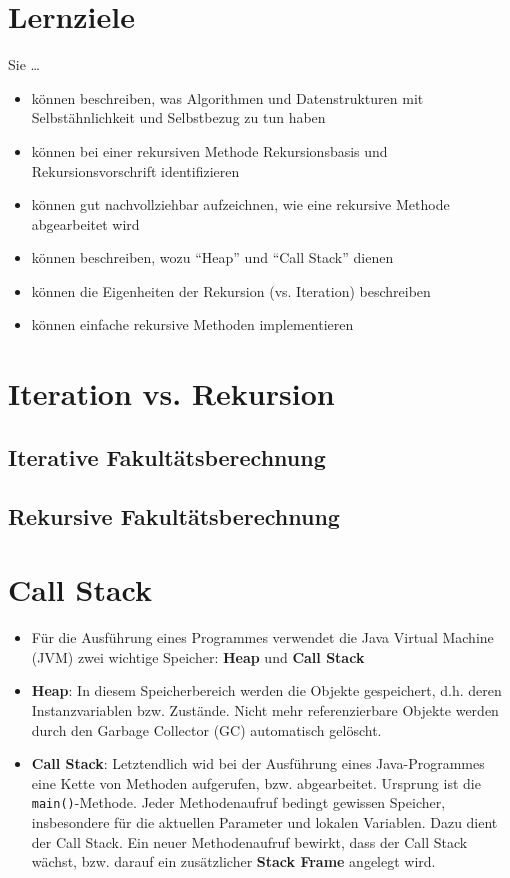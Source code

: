 \section{Lernziele}
Sie \dots
\begin{itemize}[noitemsep,topsep=0pt,leftmargin=*]
    \item können beschreiben, was Algorithmen und Datenstrukturen mit Selbstähnlichkeit und Selbstbezug zu tun haben
    \item können bei einer rekursiven Methode Rekursionsbasis und Rekursionsvorschrift identifizieren
    \item können gut nachvollziehbar aufzeichnen, wie eine rekursive Methode abgearbeitet wird
    \item können beschreiben, wozu "`Heap"' und "`Call Stack"' dienen
    \item können die Eigenheiten der Rekursion (vs. Iteration) beschreiben
    \item können einfache rekursive Methoden implementieren
\end{itemize}

\section{Iteration vs. Rekursion}
\subsection{Iterative Fakultätsberechnung}
\subsection{Rekursive Fakultätsberechnung}
\section{Call Stack}
\begin{itemize}[noitemsep,topsep=0pt,leftmargin=*]
    \item Für die Ausführung eines Programmes verwendet die Java Virtual Machine (JVM) zwei wichtige Speicher: \textbf{Heap} und \textbf{Call Stack}
    \item \textbf{Heap}: In diesem Speicherbereich werden die Objekte gespeichert, d.h. deren Instanzvariablen bzw. Zustände. Nicht mehr referenzierbare Objekte werden durch den Garbage Collector (GC) automatisch gelöscht.
    \item \textbf{Call Stack}: Letztendlich wid bei der Ausführung eines Java-Programmes eine Kette von Methoden aufgerufen, bzw. abgearbeitet. Ursprung ist die \texttt{main()}-Methode. Jeder Methodenaufruf bedingt gewissen Speicher, insbesondere für die aktuellen Parameter und lokalen Variablen. Dazu dient der Call Stack. Ein neuer Methodenaufruf bewirkt, dass der Call Stack wächst, bzw. darauf ein zusätzlicher \textbf{Stack Frame} angelegt wird.
\end{itemize}
